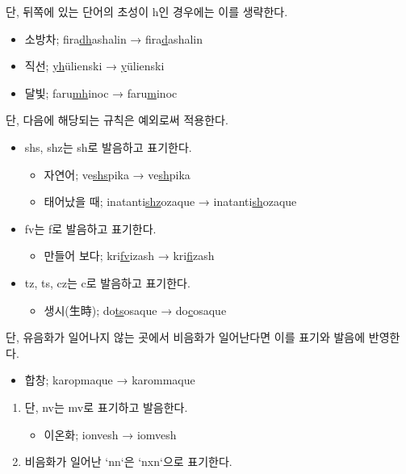 \documentclass{article}
\begin{document}
단, 뒤쪽에 있는 단어의 초성이 h인 경우에는 이를 생략한다.

\begin{itemize}
	\item 소방차; fira\underline{dh}ashalin → fira\underline{d}ashalin
	\item 직선; \underline{yh}ülienski → \underline{y}ülienski
	\item 달빛; faru\underline{mh}inoc → faru\underline{m}inoc
\end{itemize}

단, 다음에 해당되는 규칙은 예외로써 적용한다.

\begin{itemize}
	\item shs, shz는 sh로 발음하고 표기한다.
		\begin{itemize}
			\item 자연어; ve\underline{shs}pika → ve\underline{sh}pika
			\item 태어났을 때; inatanti\underline{shz}ozaque → inatanti\underline{sh}ozaque
		\end{itemize}
	\item fv는 f로 발음하고 표기한다.
		\begin{itemize}
			\item 만들어 보다; kri\underline{fv}izash → kri\underline{f}izash
		\end{itemize}
	\item tz, ts, cz는 c로 발음하고 표기한다.
		\begin{itemize}
			\item 생시(生時); do\underline{ts}osaque → do\underline{c}osaque
		\end{itemize}
\end{itemize}

단, 유음화가 일어나지 않는 곳에서 비음화가 일어난다면 이를 표기와 발음에 반영한다.

\begin{itemize}
	\item 합창; karopmaque → karommaque
\end{itemize}
\begin{enumerate}
	\item 단, nv는 mv로 표기하고 발음한다.
		\begin{itemize}
			\item 이온화; ionvesh → iomvesh
		\end{itemize}
	\item 비음화가 일어난 `nn`은 `nxn`으로 표기한다.
\end{enumerate}
\end{document}
